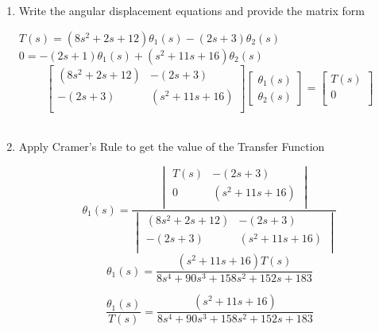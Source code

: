 \begin{fold}
\begin{enumerate}[label=(\alph*),itemindent=*, itemindent=*, leftmargin=*, nolistsep]
		\item Write the angular displacement equations and provide the matrix form
\begin{center}
	$T(s) = (8s^2+2s+12)\theta_1(s) - (2s+3)\theta_2(s)$\\
	$0 = -(2s+1)\theta_1(s) + (s^2+11s+16)\theta_2(s)$\\
	\[
		\begin{bmatrix}
		(8s^2+2s+12) & -(2s+3)\\
		-(2s+3) & (s^2+11s+16)\\
		\end{bmatrix}
		\begin{bmatrix}
		\theta_1(s) \\
		\theta_2(s)
		\end{bmatrix}
		=
		\begin{bmatrix}
		T(s)\\
		0\\
		\end{bmatrix}
	\]\\
\end{center}
		\item Apply Cramer's Rule to get the value of the Transfer Function
\begin{center}
	\[
		\theta_1(s) = 
			\frac{\begin{vmatrix}
				T(s) & -(2s+3)\\
		          0 & (s^2+11s+16)\\
			\end{vmatrix}
		}{\begin{vmatrix}
				(8s^2+2s+12) & -(2s+3)\\
		          -(2s+3) & (s^2+11s+16)\\
			\end{vmatrix}
		}
	\]
	\[
	\theta_1(s) = \frac{(s^2 + 11s + 16)T(s)}{8s^4 + 90s^3 + 158s^2 + 152s + 183}
	\] 

	\[
	\boxed{\frac{\theta_1(s)}{T(s)} = \frac{(s^2 + 11s + 16)}{8s^4 + 90s^3 + 158s^2 + 152s + 183}}
	\]
\end{center}
	\end{enumerate}
\end{fold}

